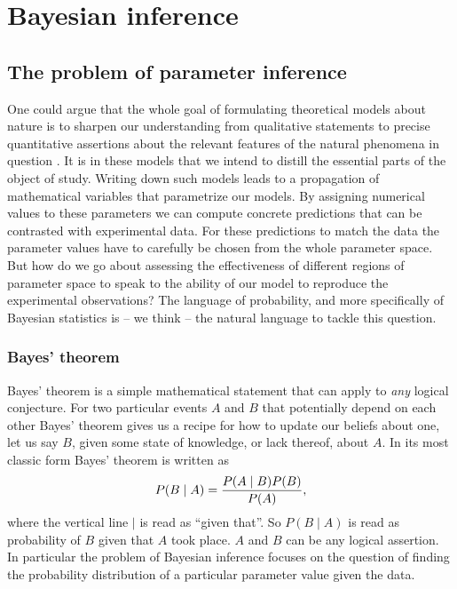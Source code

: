 \section{Bayesian inference}
\label{sec:bayesian}

\subsection{The problem of parameter inference}

One could argue that the whole goal of formulating theoretical models about
nature is to sharpen our understanding from qualitative statements to precise
quantitative assertions about the relevant features of the natural phenomena in
question \cite{Gunawardena2014}. It is in these models that we intend to distill
the essential parts of the object of study. Writing down such models leads to a
propagation of mathematical variables that parametrize our models. By assigning
numerical values to these parameters we can compute concrete predictions that
can be contrasted with experimental data. For these predictions to match the
data the parameter values have to carefully be chosen from the whole parameter
space. But how do we go about assessing the effectiveness of different regions
of parameter space to speak to the ability of our model to reproduce the
experimental observations? The language of probability, and more specifically of
Bayesian statistics is -- we think -- the natural language to tackle this
question.

\subsubsection{Bayes' theorem}

Bayes' theorem is a simple mathematical statement that can apply to \textit{any}
logical conjecture. For two particular events $A$ and $B$ that potentially 
depend on each other Bayes' theorem gives us a recipe for how to update our 
beliefs about one, let us say $B$, given some state of knowledge, or lack thereof, about
$A$. In its most classic form Bayes' theorem is written as
\begin{equation}
P(B \mid A) = {P(A \mid B) P(B) \over P(A)},
\end{equation}
where the vertical line $\mid$ is read as ``given that''. So $P(B \mid A)$ is
read as probability of $B$ given that $A$ took place. $A$ and $B$ can be any
logical assertion. In particular the problem of Bayesian inference focuses on
the question of finding the probability distribution of a particular parameter
value given the data.

